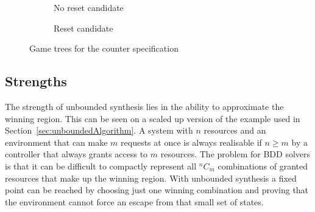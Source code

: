 \begin{figure}
    \begin{subfigure}[t]{0.5\textwidth}
        \centering
        \caption{No reset candidate}
        \label{fig:limitationAGTa}
    \end{subfigure}
    \begin{subfigure}[t]{0.5\textwidth}
        \centering
        \caption{Reset candidate}
        \label{fig:limitationAGTb}
    \end{subfigure}
    \caption{Game trees for the counter specification}
    \label{fig:limitationAGT}
\end{figure}

\subsection{Strengths}

The strength of unbounded synthesis lies in the ability to approximate the winning region. This can be seen on a scaled up version of the example used in Section~\ref{sec:unboundedAlgorithm}. A system with $n$ resources and an environment that can make $m$ requests at once is always realisable if $n \geq m$ by a controller that always grants access to $m$ resources. The problem for BDD solvers is that it can be difficult to compactly represent all $^n C_m$ combinations of granted resources that make up the winning region. With unbounded synthesis a fixed point can be reached by choosing just one winning combination and proving that the environment cannot force an escape from that small set of states.

